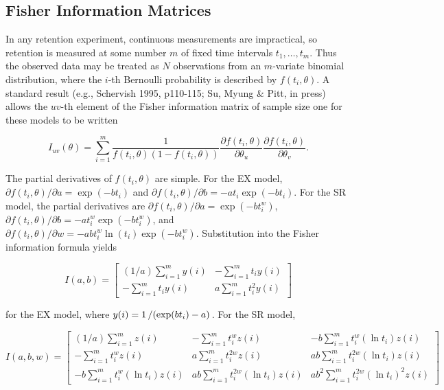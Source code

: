 \documentclass[doc,floatsintext]{apa6}
\begin{document}
\subsection*{Fisher Information Matrices}

In any retention experiment, continuous measurements are impractical, so retention is measured at some number $m$ of fixed time intervals $t_1,\ldots, t_m$. Thus the observed data may be treated as $N$ observations from an $m$-variate binomial distribution, where the $i$-th Bernoulli probability is described by $f(t_i, \theta)$. A standard result (e.g., Schervish 1995, p110-115; Su, Myung \& Pitt, in press) allows the $uv$-th element of the Fisher information matrix of sample size one for these models to be written

\begin{displaymath}
I_{uv}(\theta)= \sum_{i=1}^m \frac{1}{f(t_i, \theta)(1-f(t_i, \theta))} \frac{\partial f(t_i, \theta)}{\partial \theta_u} \frac{\partial f(t_i, \theta)}{\partial \theta_v}.
\end{displaymath}

\noindent
The partial derivatives of $f(t_i, \theta)$ are simple. For the EX model, $\partial f(t_i, \theta) / \partial a = \exp(-bt_i)$ and $\partial f(t_i, \theta) / \partial b = -at_i \exp(-bt_i)$. For the SR model, the partial derivatives are $\partial f(t_i, \theta) / \partial a = \exp(-bt_i^w)$, $\partial f(t_i, \theta) / \partial b = -at_i^w \exp(-bt_i^w)$, and $\partial f(t_i, \theta) / \partial w = -abt_i^w \ln(t_i) \exp(-bt_i^w)$. Substitution into the Fisher information formula yields

\begin{displaymath}
I(a,b) = \left[ \begin{array}{cc} (1/a) \sum_{i=1}^m y(i) & -\sum_{i=1}^m t_i y(i)  \\ -\sum_{i=1}^m t_i y(i) & a \sum_{i=1}^m t_i^2 y(i) \end{array} \right]
\end{displaymath}

\noindent
for the EX model, where $y(i)=1\left/ (\exp(bt_i) - a)\right.$. For the SR model,

\footnotesize
\begin{displaymath}
I(a,b,w) = \left[ \begin{array}{ccc} (1/a) \sum_{i=1}^{m} z(i) & -\sum_{i=1}^{m} t_i^w z(i) & -b \sum_{i=1}^{m} t_i^w (\ln t_i) z(i) \\ -\sum_{i=1}^{m} t_i^w z(i) & a \sum_{i=1}^{m} t_i^{2w} z(i) & ab \sum_{i=1}^{m} t_i^{2w} (\ln t_i) z(i) \\ -b \sum_{i=1}^{m} t_i^w (\ln t_i) z(i) & ab \sum_{i=1}^{m} t_i^{2w} (\ln t_i) z(i) &  ab^2 \sum_{i=1}^{m} t_i^{2w} (\ln t_i)^2 z(i)\end{array} \right]
\end{displaymath}
\normalsize
\end{document}
